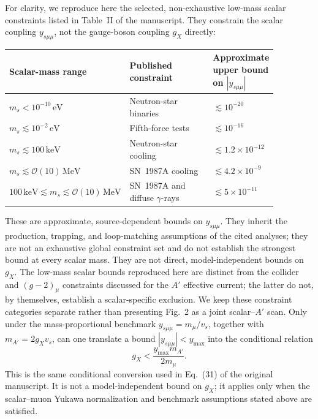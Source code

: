 \documentclass[12pt,a4paper]{article}
\begin{document}
For clarity, we reproduce here the selected, non-exhaustive low-mass scalar constraints listed in Table~II of the manuscript. They constrain the scalar coupling \(y_{s\mu\mu}\), not the gauge-boson coupling \(g_X\) directly:
\begin{center}
\small
\begin{tabular}{p{0.28\linewidth}p{0.39\linewidth}p{0.20\linewidth}}
\hline
Scalar-mass range & Published constraint & Approximate upper bound on \(|y_{s\mu\mu}|\)\\
\hline
\(m_s<10^{-10}\,\mathrm{eV}\) & Neutron-star binaries~\cite{Dror:2019uea,Liu:2025zuz} & \(\lesssim10^{-20}\)\\
\(m_s\lesssim10^{-2}\,\mathrm{eV}\) & Fifth-force tests~\cite{Hoskins:1985tn,Kapner:2006si,Blakemore:2021zna} & \(\lesssim10^{-16}\)\\
\(m_s\lesssim100\,\mathrm{keV}\) & Neutron-star cooling~\cite{Fiorillo:2026wso} & \(\lesssim1.2\times10^{-12}\)\\
\(m_s\lesssim\mathcal{O}(10)\,\mathrm{MeV}\) & SN~1987A cooling~\cite{Caputo:2021rux,Balazs:2022tjl} & \(\lesssim4.2\times10^{-9}\)\\
\(100\,\mathrm{keV}\lesssim m_s\lesssim\mathcal{O}(10)\,\mathrm{MeV}\) & SN~1987A and diffuse \(\gamma\)-rays~\cite{Caputo:2021rux,Balazs:2022tjl} & \(\lesssim5\times10^{-11}\)\\
\hline
\end{tabular}
\end{center}
These are approximate, source-dependent bounds on \(y_{s\mu\mu}\). They inherit the production, trapping, and loop-matching assumptions of the cited analyses; they are not an exhaustive global constraint set and do not establish the strongest bound at every scalar mass. They are not direct, model-independent bounds on \(g_X\). The low-mass scalar bounds reproduced here are distinct from the collider and \((g-2)_\mu\) constraints discussed for the \(A'\) effective current; the latter do not, by themselves, establish a scalar-specific exclusion. We keep these constraint categories separate rather than presenting Fig.~2 as a joint scalar--\(A'\) scan. Only under the mass-proportional benchmark \(y_{s\mu\mu}=m_\mu/v_s\), together with \(m_{A'}=2g_Xv_s\), can one translate a bound \(|y_{s\mu\mu}|<y_{\max}\) into the conditional relation
\[
g_X<\frac{y_{\max}m_{A'}}{2m_\mu}.
\]
This is the same conditional conversion used in Eq.~(31) of the original manuscript. It is not a model-independent bound on \(g_X\); it applies only when the scalar--muon Yukawa normalization and benchmark assumptions stated above are satisfied.
\end{document}
